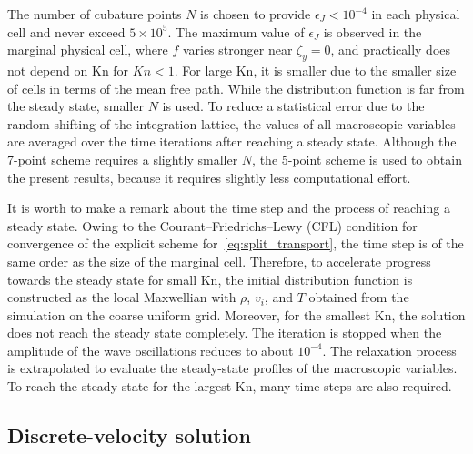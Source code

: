 \documentclass[review]{elsarticle}
\newcommand{\Kn}{\mathrm{Kn}}
\begin{document}
The number of cubature points \(N\) is chosen to provide \(\epsilon_J<10^{-4}\)
in each physical cell and never exceed \(5\times10^5\).
The maximum value of \(\epsilon_J\) is observed in the marginal physical cell,
where \(f\) varies stronger near \(\zeta_y = 0\), and practically does not depend on \(\Kn\) for \(Kn<1\).
For large \(\Kn\), it is smaller due to the smaller size of cells in terms of the mean free path.
While the distribution function is far from the steady state, smaller \(N\) is used.
To reduce a statistical error due to the random shifting of the integration lattice,
the values of all macroscopic variables are averaged over the time iterations
after reaching a steady state.
Although the 7-point scheme requires a slightly smaller \(N\),
the 5-point scheme is used to obtain the present results,
because it requires slightly less computational effort.

It is worth to make a remark about the time step and the process of reaching a steady state.
Owing to the Courant--Friedrichs--Lewy (CFL) condition
for convergence of the explicit scheme for~\eqref{eq:split_transport},
the time step is of the same order as the size of the marginal cell.
Therefore, to accelerate progress towards the steady state for small \(\Kn\),
the initial distribution function is constructed as the local Maxwellian
with \(\rho\), \(v_i\), and \(T\) obtained from the simulation on the coarse uniform grid.
Moreover, for the smallest \(\Kn\), the solution does not reach the steady state completely.
The iteration is stopped when the amplitude of the wave oscillations reduces to about \(10^{-4}\).
The relaxation process is extrapolated to evaluate the steady-state profiles of the macroscopic variables.
To reach the steady state for the largest \(\Kn\), many time steps are also required.

\subsection{Discrete-velocity solution}
\end{document}
